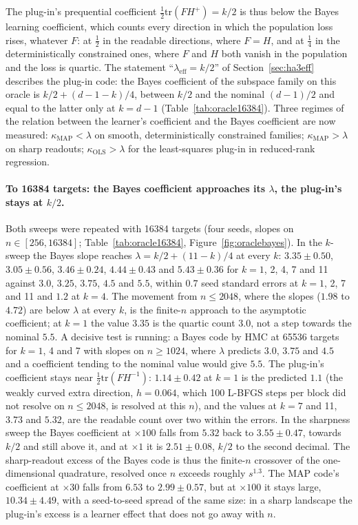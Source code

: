 \documentclass[11pt,a4paper]{article}
\begin{document}
The plug-in's prequential coefficient $\tfrac12\mathrm{tr}(FH^{+})=k/2$ is thus below the Bayes learning coefficient, which counts every direction in which the population loss rises, whatever $F$: at $\tfrac12$ in the readable directions, where $F=H$, and at $\tfrac14$ in the deterministically constrained ones, where $F$ and $H$ both vanish in the population and the loss is quartic. The statement ``$\lambda_{\mathrm{eff}}=k/2$'' of Section~\ref{sec:ha3eff} describes the plug-in code: the Bayes coefficient of the subspace family on this oracle is $k/2+(d-1-k)/4$, between $k/2$ and the nominal $(d-1)/2$ and equal to the latter only at $k=d-1$ (Table~\ref{tab:oracle16384}). Three regimes of the relation between the learner's coefficient and the Bayes coefficient are now measured: $\kappa_{\mathrm{MAP}}<\lambda$ on smooth, deterministically constrained families; $\kappa_{\mathrm{MAP}}>\lambda$ on sharp readouts; $\kappa_{\mathrm{OLS}}>\lambda$ for the least-squares plug-in in reduced-rank regression.

\paragraph{To 16384 targets: the Bayes coefficient approaches its $\lambda$, the plug-in's stays at $k/2$.} Both sweeps were repeated with 16384 targets (four seeds, slopes on $n\in[256,16384]$; Table~\ref{tab:oracle16384}, Figure~\ref{fig:oraclebayes}). In the $k$-sweep the Bayes slope reaches $\lambda=k/2+(11-k)/4$ at every $k$: $3.35\pm0.50$, $3.05\pm0.56$, $3.46\pm0.24$, $4.44\pm0.43$ and $5.43\pm0.36$ for $k=1$, 2, 4, 7 and 11 against $3.0$, $3.25$, $3.75$, $4.5$ and $5.5$, within $0.7$ seed standard errors at $k=1$, 2, 7 and 11 and $1.2$ at $k=4$. The movement from $n\le2048$, where the slopes ($1.98$ to $4.72$) are below $\lambda$ at every $k$, is the finite-$n$ approach to the asymptotic coefficient; at $k=1$ the value $3.35$ is the quartic count $3.0$, not a step towards the nominal $5.5$. A decisive test is running: a Bayes code by HMC at 65536 targets for $k=1$, 4 and 7 with slopes on $n\ge1024$, where $\lambda$ predicts $3.0$, $3.75$ and $4.5$ and a coefficient tending to the nominal value would give $5.5$. The plug-in's coefficient stays near $\tfrac12\mathrm{tr}(FH^{-1})$: $1.14\pm0.42$ at $k=1$ is the predicted $1.1$ (the weakly curved extra direction, $h=0.064$, which 100 L-BFGS steps per block did not resolve on $n\le2048$, is resolved at this $n$), and the values at $k=7$ and 11, $3.73$ and $5.32$, are the readable count over two within the errors. In the sharpness sweep the Bayes coefficient at $\times100$ falls from $5.32$ back to $3.55\pm0.47$, towards $k/2$ and still above it, and at $\times1$ it is $2.51\pm0.08$, $k/2$ to the second decimal. The sharp-readout excess of the Bayes code is thus the finite-$n$ crossover of the one-dimensional quadrature, resolved once $n$ exceeds roughly $s^{1.3}$. The MAP code's coefficient at $\times30$ falls from $6.53$ to $2.99\pm0.57$, but at $\times100$ it stays large, $10.34\pm4.49$, with a seed-to-seed spread of the same size: in a sharp landscape the plug-in's excess is a learner effect that does not go away with $n$.
\end{document}
